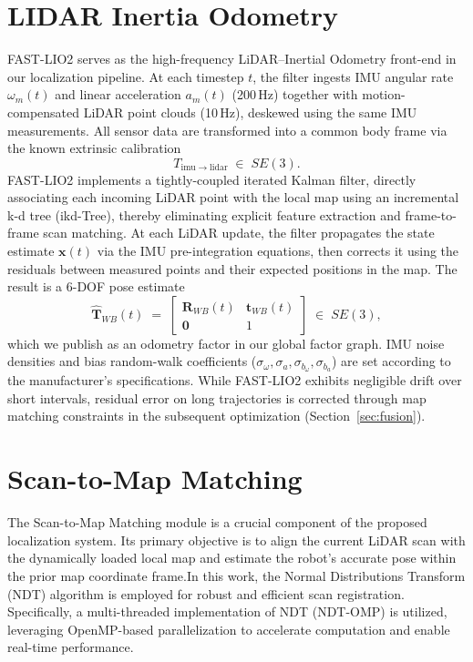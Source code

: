 \section{LIDAR Inertia Odometry} 
FAST-LIO2 serves as the high-frequency LiDAR–Inertial Odometry front-end in our localization pipeline. At each timestep \(t\), the filter ingests IMU angular rate \(\omega_m(t)\) and linear acceleration \(a_m(t)\) (200\,Hz) together with motion-compensated LiDAR point clouds (10\,Hz), deskewed using the same IMU measurements. All sensor data are transformed into a common body frame via the known extrinsic calibration 
\begin{equation}
	T_{\mathrm{imu}\to\mathrm{lidar}}
	\;\in\;SE(3).
\end{equation}
FAST-LIO2 implements a tightly-coupled iterated Kalman filter, directly associating each incoming LiDAR point with the local map using an incremental k-d tree (ikd-Tree), thereby eliminating explicit feature extraction and frame-to-frame scan matching. At each LiDAR update, the filter propagates the state estimate \(\mathbf{x}(t)\) via the IMU pre-integration equations, then corrects it using the residuals between measured points and their expected positions in the map. The result is a 6-DOF pose estimate
\begin{equation}
	\hat{\mathbf{T}}_{WB}(t)
	\;=\;
	\begin{bmatrix}
		\mathbf{R}_{WB}(t) & \mathbf{t}_{WB}(t) \\
		\mathbf{0}           & 1
	\end{bmatrix}
	\;\in\;SE(3),
\end{equation}
which we publish as an odometry factor in our global factor graph. IMU noise densities and bias random-walk coefficients (\(\sigma_\omega, \sigma_a, \sigma_{b_\omega}, \sigma_{b_a}\)) are set according to the manufacturer’s specifications. While FAST-LIO2 exhibits negligible drift over short intervals, residual error on long trajectories is corrected through map matching constraints in the subsequent optimization (Section~\ref{sec:fusion}).


\section{Scan-to-Map Matching}

The Scan-to-Map Matching module is a crucial component of the proposed localization system. Its primary objective is to align the current LiDAR scan with the dynamically loaded local map and estimate the robot's accurate pose within the prior map coordinate frame.In this work, the Normal Distributions Transform (NDT)\cite{biber2003ndt} algorithm is employed for robust and efficient scan registration. Specifically, a multi-threaded implementation of NDT (NDT-OMP) \cite{koide2019portable} is utilized, leveraging OpenMP-based parallelization to accelerate computation and enable real-time performance. 



